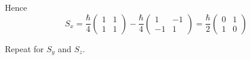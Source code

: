 Hence
\begin{equation*}
S_x=\frac{\hbar}{4}\begin{pmatrix}1&1\\1&1\end{pmatrix}
-\frac{\hbar}{4}\begin{pmatrix}1&-1\\-1&1\end{pmatrix}
=\frac{\hbar}{2}\begin{pmatrix}0&1\\1&0\end{pmatrix}
\end{equation*}

Repeat for $S_y$ and $S_z$.


